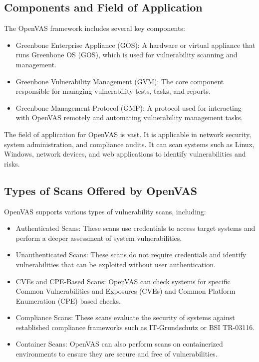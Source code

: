 \documentclass[twocolumn]{article}
\begin{document}
\subsection{Components and Field of Application}

The OpenVAS framework includes several key components:

\begin{itemize}
    \item Greenbone Enterprise Appliance (GOS): A hardware or virtual appliance that runs Greenbone OS (GOS), which is used for vulnerability scanning and management. 
    \item Greenbone Vulnerability Management (GVM): The core component responsible for managing vulnerability tests, tasks, and reports.
    \item Greenbone Management Protocol (GMP): A protocol used for interacting with OpenVAS remotely and automating vulnerability management tasks.
\end{itemize}

The field of application for OpenVAS is vast. It is applicable in network security, system administration, and compliance audits. It can scan systems such as Linux, Windows, network devices, and web applications to identify vulnerabilities and risks. 

\subsection{Types of Scans Offered by OpenVAS}

OpenVAS supports various types of vulnerability scans, including:

\begin{itemize}
    \item Authenticated Scans: These scans use credentials to access target systems and perform a deeper assessment of system vulnerabilities.
    \item Unauthenticated Scans: These scans do not require credentials and identify vulnerabilities that can be exploited without user authentication.
    \item CVEs and CPE-Based Scans: OpenVAS can check systems for specific Common Vulnerabilities and Exposures (CVEs) and Common Platform Enumeration (CPE) based checks.
    \item Compliance Scans: These scans evaluate the security of systems against established compliance frameworks such as IT-Grundschutz or BSI TR-03116.
    \item Container Scans: OpenVAS can also perform scans on containerized environments to ensure they are secure and free of vulnerabilities.
\end{itemize}
\end{document}
